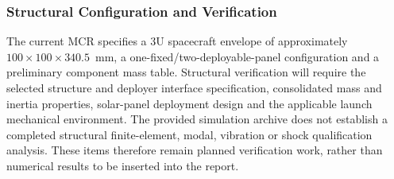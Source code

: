 \subsubsection{Structural Configuration and Verification}\label{app:structural-verification}
The current MCR specifies a 3U spacecraft envelope of approximately $100\times100\times340.5$~mm, a one-fixed/two-deployable-panel configuration and a preliminary component mass table. Structural verification will require the selected structure and deployer interface specification, consolidated mass and inertia properties, solar-panel deployment design and the applicable launch mechanical environment. The provided simulation archive does not establish a completed structural finite-element, modal, vibration or shock qualification analysis. These items therefore remain planned verification work, rather than numerical results to be inserted into the report.
